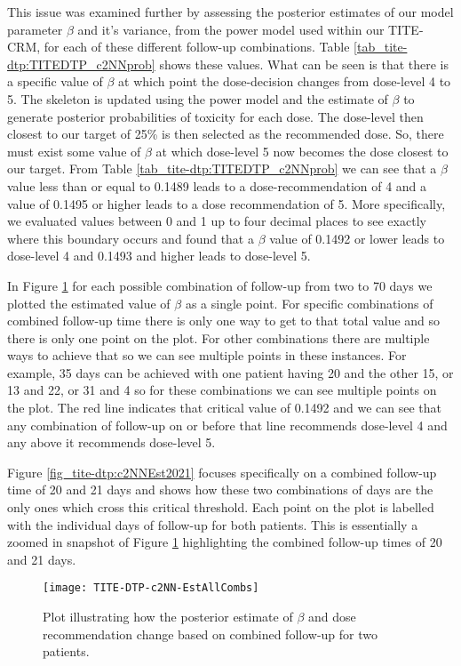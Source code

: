This issue was examined further by assessing the posterior estimates of our model parameter $\beta$ and it's variance, from the power model used within our TITE-CRM, for each of these different follow-up combinations. Table \ref{tab_tite-dtp:TITEDTP_c2NNprob} shows these values. What can be seen is that there is a specific value of $\beta$ at which point the dose-decision changes from dose-level 4 to 5. The skeleton is updated using the power model and the estimate of $\beta$ to generate posterior probabilities of toxicity for each dose. The dose-level then closest to our target of 25\% is then selected as the recommended dose. So, there must exist some value of $\beta$ at which dose-level 5 now becomes the dose closest to our target. From Table \ref{tab_tite-dtp:TITEDTP_c2NNprob} we can see that a $\beta$ value less than or equal to 0.1489 leads to a dose-recommendation of 4 and a value of 0.1495 or higher leads to a dose recommendation of 5. More specifically, we evaluated values between 0 and 1 up to four decimal places to see exactly where this boundary occurs and found that a $\beta$ value of 0.1492 or lower leads to dose-level 4 and 0.1493 and higher leads to dose-level 5. 

In Figure \ref{fig_tite-dtp:c2NNEstAllCombs} for each possible combination of follow-up from two to 70 days we plotted the estimated value of $\beta$ as a single point. For specific combinations of combined follow-up time there is only one way to get to that total value and so there is only one point on the plot. For other combinations there are multiple ways to achieve that so we can see multiple points in these instances. For example, 35 days can be achieved with one patient having 20 and the other 15, or 13 and 22, or 31 and 4 so for these combinations we can see multiple points on the plot. The red line indicates that critical value of 0.1492 and we can see that any combination of follow-up on or before that line recommends dose-level 4 and any above it recommends dose-level 5. 

Figure \ref{fig_tite-dtp:c2NNEst2021} focuses specifically on a combined follow-up time of 20 and 21 days and shows how these two combinations of days are the only ones which cross this critical threshold. Each point on the plot is labelled with the individual days of follow-up for both patients. This is essentially a zoomed in snapshot of Figure \ref{fig_tite-dtp:c2NNEstAllCombs} highlighting the combined follow-up times of 20 and 21 days. 

\begin{figure}[h!]
	\centering
	\caption[Changes in $\beta$ based on combined follow-up for two patients.]{Plot illustrating how the posterior estimate of $\beta$ and dose recommendation change based on combined follow-up for two patients.}
	\label{fig_tite-dtp:c2NNEstAllCombs}
	\texttt{[image: TITE-DTP-c2NN-EstAllCombs]}
\end{figure}

